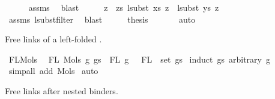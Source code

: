 \begin{isabellebody}
\ \ \ \ \isamarkupfalse%
\ assms{\isacharparenleft}{\kern0pt}{}{\isacharparenright}{\kern0pt}\ \isamarkupfalse%
\ blast\isanewline
\isanewline
\ \ \isamarkupfalse%
\ \isamarkupfalse%
\ {\isachardoublequoteopen}{\isasymforall}z\ {\isacharbar}{\kern0pt}{\isasymin}{\isacharbar}{\kern0pt}\ zs{\isachardot}{\kern0pt}\ {\isacharparenleft}{\kern0pt}lsubst\ xs\ z\ {\isacharequal}{\kern0pt}\ lsubst\ ys\ z{\isacharparenright}{\kern0pt}{\isachardoublequoteclose}\isanewline
\ \ \ \ \isamarkupfalse%
\ assms{\isacharparenleft}{\kern0pt}{}{\isacharparenright}{\kern0pt}\ lsubst{\isacharunderscore}{\kern0pt}filter\ \isamarkupfalse%
\ blast\isanewline
\isanewline
\ \ \isamarkupfalse%
\ \isamarkupfalse%
\ {\isacharquery}{\kern0pt}thesis\ \isanewline
\ \ \ \ \isamarkupfalse%
\ auto\isanewline
{}\isamarkupfalse%
%
\endisatagproof
{\isafoldproof}%
%
\isadelimproof
%
\endisadelimproof
%
\isadelimdocument
%
\endisadelimdocument
%
\isatagdocument
%
\isamarkuptrue%
%
\endisatagdocument
{\isafolddocument}%
%
\isadelimdocument
%
\endisadelimdocument
%
\begin{isamarkuptext}%
Free links of a left-folded .%
\end{isamarkuptext}\isamarkuptrue%
\isamarkupfalse%
\ FL{\isacharunderscore}{\kern0pt}Mols{}{\isacharcolon}{\kern0pt}\isanewline
\ \ {\isachardoublequoteopen}FL\ {\isacharparenleft}{\kern0pt}Mols{}\ g\ gs{\isacharparenright}{\kern0pt}\ {\isacharequal}{\kern0pt}\ FL\ g\ {\isasymunion}\ {\isasymUnion}\ {\isacharparenleft}{\kern0pt}FL\ {\isacharbackquote}{\kern0pt}\ set\ gs{\isacharparenright}{\kern0pt}{\isachardoublequoteclose}\isanewline
%
\isadelimproof
%
\endisadelimproof
%
\isatagproof
{}\isamarkupfalse%
\ {\isacharparenleft}{\kern0pt}induct\ gs\ arbitrary{\isacharcolon}{\kern0pt}\ g{\isacharparenright}{\kern0pt}\isanewline
{}\isamarkupfalse%
\ {\isacharparenleft}{\kern0pt}simp{\isacharunderscore}{\kern0pt}all\ add{\isacharcolon}{\kern0pt}\ Mols{}{\isacharparenright}{\kern0pt}\isanewline
{}\isamarkupfalse%
\ auto%
\endisatagproof
{\isafoldproof}%
%
\isadelimproof
%
\endisadelimproof
%
\begin{isamarkuptext}%
Free links after  nested  binders.%
\end{isamarkuptext}\isamarkuptrue%

\end{isabellebody}
